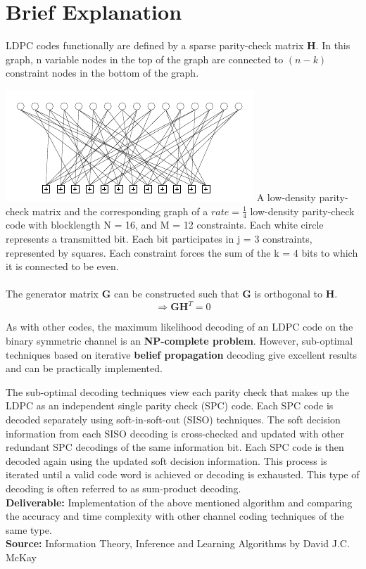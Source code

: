\documentclass[12pt]{extarticle}
\newcommand{\<}{\langle}
\renewcommand{\>}{\rangle}
\theoremstyle{definition}
\begin{document}
\section{Brief Explanation}
LDPC codes functionally are defined by a sparse parity-check matrix \textbf{H}. In this graph, n variable nodes in the top of the graph are connected to $(n-k)$ constraint nodes in the bottom of the graph.

\includegraphics[scale = 2]{1.jpg} \newline
A low-density parity-check matrix and the corresponding graph of a $rate = \frac{1}{4}$ low-density parity-check code with blocklength N = 16, and
M = 12 constraints. Each white circle represents a transmitted bit.
Each bit participates in j = 3 constraints, represented by squares. Each constraint forces the sum of the k = 4 bits to which it is connected to be even.\\ \\
The generator matrix \textbf{G} can be constructed such that \textbf{G} is orthogonal to \textbf{H}. 
\begin{equation} \Rightarrow \textbf{G}\textbf{H}^T = 0 \end{equation}

As with other codes, the maximum likelihood decoding of an LDPC code on the binary symmetric channel is an \textbf{NP-complete problem}. However, sub-optimal techniques based on iterative \textbf{belief propagation} decoding give excellent results and can be practically implemented. 

The sub-optimal decoding techniques view each parity check that makes up the LDPC as an independent single parity check (SPC) code. Each SPC code is decoded separately using soft-in-soft-out (SISO) techniques. The soft decision information from each SISO decoding is cross-checked and updated with other redundant SPC decodings of the same information bit. Each SPC code is then decoded again using the updated soft decision information. This process is iterated until a valid code word is achieved or decoding is exhausted. This type of decoding is often referred to as sum-product decoding. \\

\textbf{Deliverable: }Implementation of the above mentioned algorithm and comparing the accuracy and time complexity with other channel coding techniques of the same type. \\

\textbf{Source: }Information Theory, Inference and Learning Algorithms by David J.C. McKay
\end{document}
